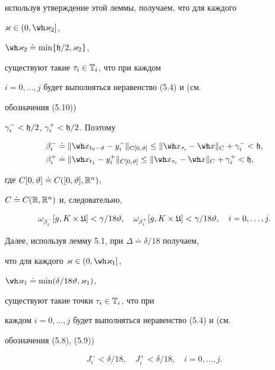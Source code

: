 используя утверждение этой леммы, получаем, что для каждого


$\varkappa\in(0,\wh\varkappa_2]$,


$\wh\varkappa_2\doteq\min\{\frak h/2,\varkappa_2\}$,


существуют такие $\tau_i\in\Bbb T_i$, что при каждом


$i=0,\dotsc,j$ будет выполняться неравенство (5.4) и (см. 


обозначения (5.10))


$\gamma_i^-<\frak h/2$, $\gamma_i^+<\frak h/2$. Поэтому


\begin{align*}


\beta_i^-&\doteq\|\wh x_{t_{0}-\vartheta


}-y_i^-\|_{C[0,\vartheta]}\le


\|\wh x_{\tau_i}-\wh x\|_C+\gamma_i^-<\frak h, \\


\beta_i^+&\doteq\|\wh x_{t_1}-y_i^+\|_{C[0,\vartheta]}


\le\|\wh x_{\tau_i}-\wh x\|_C+\gamma_i^+<\frak h,


\end{align*}


где $C[0,\vartheta]\doteq C([0,\vartheta],\Bbb R^n)$,


$C\doteq C(\Bbb R,\Bbb R^n)$ и, следовательно,


\begin{equation}


\omega_{\beta_i^-}[g,K\times\frak U]<\gamma /18\vartheta,


\quad \omega_{\beta_i^+}[g,K\times\frak U]<\gamma/18\vartheta,


\quad i=0,\dotsc,j.


\end{equation}





Далее, используя лемму 5.1, при $\Delta\doteq\delta/18$ получаем,


что для каждого $\varkappa\in(0,\wh\varkappa_1]$, 


$\wh\varkappa_1\doteq\min(\delta/18\vartheta ,\varkappa_1)$,


существуют такие точки $\tau_i\in\Bbb T_i$, что при


каждом $i=0,\dotsc,j$ будет выполняться неравенство (5.4) и (см.


обозначения (5.8), (5.9))


\begin{equation}


J_i^-<\delta/18,\quad J_i^+<\delta/18,\quad i=0,\dotsc,j.


\end{equation}





